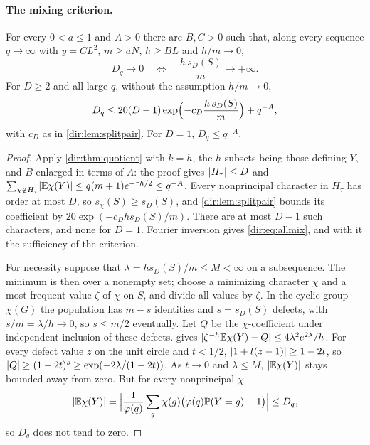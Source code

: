 \paragraph{The mixing criterion.}

\begin{theorem}\label{dir:thm:allmix}
For every $0<a\le1$ and $A>0$ there are $B,C>0$ such that, along every sequence $q\to\infty$ with
$y=CL^2$, $m\ge aN$, $h\ge BL$ and $h/m\to0$,
\[
 D_q\longrightarrow0\quad\Longleftrightarrow\quad\frac{h\,s_D(S)}m\longrightarrow+\infty .
\]
For $D\ge2$ and all large $q$, without the assumption $h/m\to0$,
\begin{equation}\label{dir:eq:allmix}
 D_q\le20(D-1)\exp\Bigl(-c_D\frac{h\,s_D(S)}m\Bigr)+q^{-A},
\end{equation}
with $c_D$ as in \cref{dir:lem:splitpair}. For $D=1$, $D_q\le q^{-A}$.
\end{theorem}

\begin{proof}
Apply \cref{dir:thm:quotient} with $k=h$, the $h$-subsets being those defining $Y$, and $B$ enlarged in
terms of $A$: the proof gives $\lvert H_\tau\rvert\le D$ and
$\sum_{\chi\notin H_\tau}\lvert\mathbb{E}\chi(Y)\rvert\le q(m+1)e^{-\tau h/2}\le q^{-A}$. Every nonprincipal
character in $H_\tau$ has order at most $D$, so $s_\chi(S)\ge s_D(S)$, and \cref{dir:lem:splitpair}
bounds its coefficient by $20\exp(-c_Dhs_D(S)/m)$. There are at most $D-1$ such characters, and none for
$D=1$. Fourier inversion gives \eqref{dir:eq:allmix}, and with it the sufficiency of the criterion.

For necessity suppose that $\lambda=hs_D(S)/m\le M<\infty$ on a subsequence. The minimum is then over a
nonempty set; choose a minimizing character $\chi$ and a most frequent value $\zeta$ of $\chi$ on $S$, and
divide all values by $\zeta$. In the cyclic group $\chi(G)$ the population has $m-s$ identities and
$s=s_D(S)$ defects, with $s/m=\lambda/h\to0$, so $s\le m/2$ eventually. Let $Q$ be the $\chi$-coefficient
under independent inclusion of these defects.  gives
$\lvert\zeta^{-h}\mathbb{E}\chi(Y)-Q\rvert\le4\lambda^2e^{2\lambda}/h$. For every defect value $z$ on the unit circle
and $t<1/2$, $\lvert1+t(z-1)\rvert\ge1-2t$, so $\lvert Q\rvert\ge(1-2t)^s\ge\exp(-2\lambda/(1-2t))$. As $t\to0$ and
$\lambda\le M$, $\lvert\mathbb{E}\chi(Y)\rvert$ stays bounded away from zero. But for every nonprincipal $\chi$
\[
 \lvert\mathbb{E}\chi(Y)\rvert=\Bigl|\frac1{\varphi(q)}\sum_g\chi(g)\bigl(\varphi(q)\mathbb{P}(Y=g)-1\bigr)\Bigr|\le D_q ,
\]
so $D_q$ does not tend to zero.
\end{proof}

